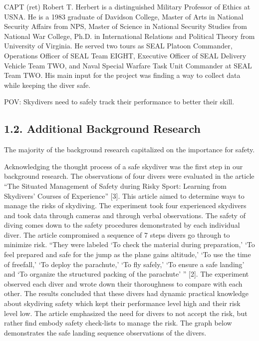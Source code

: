 \documentclass[10pt]{article}
\begin{document}
CAPT (ret) Robert T. Herbert is a distinguished Military Professor of Ethics at USNA. He is a 1983 graduate of Davidson College, Master of Arts in National Security Affairs from NPS, Master of Science in National Security Studies from National War College, Ph.D. in International Relations and Political Theory from University of Virginia. He served two tours as SEAL Platoon Commander, Operations Officer of SEAL Team EIGHT, Executive Officer of SEAL Delivery Vehicle Team TWO, and Naval Special Warfare Task Unit Commander at SEAL Team TWO. His main input for the project was finding a way to collect data while keeping the diver safe.

POV: Skydivers need to safely track their performance to better their skill.

\subsection{1.2. Additional Background Research}
The majority of the background research capitalized on the importance for safety. 

Acknowledging the thought process of a safe skydiver was the first step in our background research. The observations of four divers were evaluated in the article ``The Situated Management of Safety during Risky Sport: Learning from Skydivers’ Courses of Experience'' [3]. This article aimed to determine ways to manage the risks of skydiving. The experiment took four experienced skydivers and took data through cameras and through verbal observations. The safety of diving comes down to the safety procedures demonstrated by each individual diver. The article compromised a sequence of 7 steps divers go through to minimize risk. ``They were labeled `To check the material during preparation,' `To feel prepared and safe for the jump as the plane gains altitude,' `To use the time of freefall,' `To deploy the parachute,' `To fly safely,' `To ensure a safe landing' and `To organize the structured packing of the parachute' '' [2]. The experiment observed each diver and wrote down their thoroughness to compare with each other. The results concluded that these divers had dynamic practical knowledge about skydiving safety which kept their performance level high and their risk level low. The article emphasized the need for divers to not accept the risk, but rather find embody safety check-lists to manage the risk. The graph below demonstrates the safe landing sequence observations of the divers.
\end{document}
